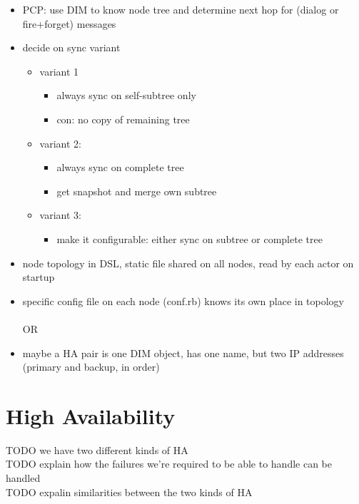 \begin{itemize}
	\item PCP: use DIM to know node tree and determine next hop for (dialog or fire+forget) messages
	\item decide on sync variant
	\begin{itemize}
		\item variant 1
		\begin{itemize}
			\item always sync on self-subtree only
			\item con: no copy of remaining tree
		\end{itemize}

		\item variant 2:
		\begin{itemize}
			\item always sync on complete tree
			\item get snapshot and merge own subtree
		\end{itemize}

		\item variant 3:
		\begin{itemize}
			\item make it configurable: either sync on subtree or complete tree
		\end{itemize}
	\end{itemize}

	\item node topology in DSL, static file shared on all nodes, read by each actor on startup
	\item specific config file on each node (conf.rb) knows its own place in topology\\
		\\
		OR\\

	\item maybe a HA pair is one DIM object, has one name, but two IP addresses (primary and backup, in order)
\end{itemize}


\section{High Availability}\label{sec:meth:ha}
TODO we have two different kinds of HA\\
TODO explain how the failures we're required to be able to handle can be handled\\
TODO expalin similarities between the two kinds of HA\\

